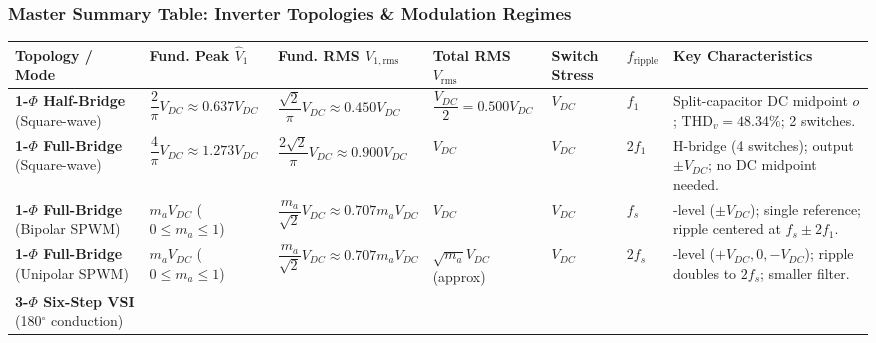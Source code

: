 \subsubsection{Master Summary Table: Inverter Topologies \& Modulation Regimes}
\begin{center}
\footnotesize
\renewcommand{\arraystretch}{1.25}
\begin{tabularx}{\textwidth}{@{} >{\raggedright\arraybackslash}p{2.5cm} >{\raggedright\arraybackslash}p{2.4cm} >{\raggedright\arraybackslash}p{2.7cm} >{\raggedright\arraybackslash}p{1.8cm} >{\centering\arraybackslash}p{1.3cm} >{\centering\arraybackslash}p{1.3cm} >{\raggedright\arraybackslash}X @{}}
\toprule
\textbf{Topology / Mode} & \textbf{Fund. Peak $\hat{V}_{1}$} & \textbf{Fund. RMS $V_{1,\mathrm{rms}}$} & \textbf{Total RMS $V_{\mathrm{rms}}$} & \textbf{Switch Stress} & $f_{\mathrm{ripple}}$ & \textbf{Key Characteristics} \\
\midrule
\textbf{1-$\Phi$ Half-Bridge} \newline (Square-wave) &
$\dfrac{2}{\pi} V_{DC} \approx 0.637 V_{DC}$ &
$\dfrac{\sqrt{2}}{\pi} V_{DC} \approx 0.450 V_{DC}$ &
$\dfrac{V_{DC}}{2} = 0.500 V_{DC}$ &
$V_{DC}$ &
$f_1$ &
Split-capacitor DC midpoint $o$; $\mathrm{THD}_v = 48.34\%$; 2 switches. \\
\midrule
\textbf{1-$\Phi$ Full-Bridge} \newline (Square-wave) &
$\dfrac{4}{\pi} V_{DC} \approx 1.273 V_{DC}$ &
$\dfrac{2\sqrt{2}}{\pi} V_{DC} \approx 0.900 V_{DC}$ &
$V_{DC}$ &
$V_{DC}$ &
$2 f_1$ &
H-bridge (4 switches); output $\pm V_{DC}$; no DC midpoint needed. \\
\midrule
\textbf{1-$\Phi$ Full-Bridge} \newline (Bipolar SPWM) &
$m_a V_{DC}$ \newline ($0 \le m_a \le 1$) &
$\dfrac{m_a}{\sqrt{2}} V_{DC} \approx 0.707 m_a V_{DC}$ &
$V_{DC}$ &
$V_{DC}$ &
$f_s$ &
2-level ($\pm V_{DC}$); single reference; ripple centered at $f_s \pm 2f_1$. \\
\midrule
\textbf{1-$\Phi$ Full-Bridge} \newline (Unipolar SPWM) &
$m_a V_{DC}$ \newline ($0 \le m_a \le 1$) &
$\dfrac{m_a}{\sqrt{2}} V_{DC} \approx 0.707 m_a V_{DC}$ &
$\sqrt{m_a} V_{DC}$ (approx) &
$V_{DC}$ &
$2 f_s$ &
3-level ($+V_{DC}, 0, -V_{DC}$); ripple doubles to $2 f_s$; smaller filter. \\
\midrule
\textbf{3-$\Phi$ Six-Step VSI} \newline (180$^\circ$ conduction) &

\end{tabularx}
\end{center}
